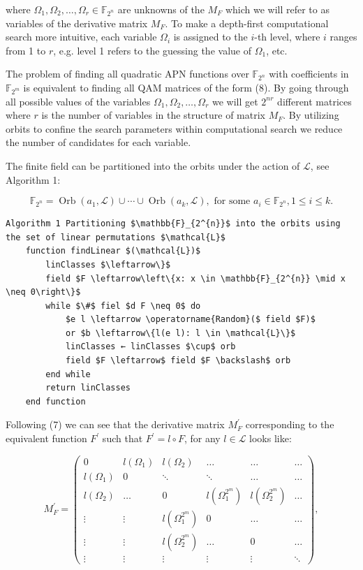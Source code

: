 \documentclass[10pt]{article}
\begin{document}
where $\Omega_{1}, \Omega_{2}, \ldots, \Omega_{r} \in \mathbb{F}_{2^{n}}$ are unknowns of the $M_{F}$ which we will refer to as variables of the derivative matrix $M_{F}$. To make a depth-first computational search more intuitive, each variable $\Omega_{i}$ is assigned to the $i$-th level, where $i$ ranges from 1 to $r$, e.g. level 1 refers to the guessing the value of $\Omega_{1}$, etc.

The problem of finding all quadratic APN functions over $\mathbb{F}_{2^{n}}$ with coefficients in $\mathbb{F}_{2^{m}}$ is equivalent to finding all QAM matrices of the form (8). By going through all possible values of the variables $\Omega_{1}, \Omega_{2}, \ldots, \Omega_{r}$ we will get $2^{n r}$ different matrices where $r$ is the number of variables in the structure of matrix $M_{F}$. By utilizing orbits to confine the search parameters within computational search we reduce the number of candidates for each variable.

The finite field can be partitioned into the orbits under the action of $\mathcal{L}$, see Algorithm 1:

$$
\mathbb{F}_{2^{n}}=\operatorname{Orb}\left(a_{1}, \mathcal{L}\right) \cup \cdots \cup \operatorname{Orb}\left(a_{k}, \mathcal{L}\right), \text { for some } a_{i} \in \mathbb{F}_{2^{n}}, 1 \leq i \leq k .
$$

\begin{verbatim}
Algorithm 1 Partitioning $\mathbb{F}_{2^{n}}$ into the orbits using the set of linear permutations $\mathcal{L}$
    function findLinear $(\mathcal{L})$
        linClasses $\leftarrow\}$
        field $F \leftarrow\left\{x: x \in \mathbb{F}_{2^{n}} \mid x \neq 0\right\}$
        while $\#$ fiel $d F \neq 0$ do
            $e l \leftarrow \operatorname{Random}($ field $F)$
            or $b \leftarrow\{l(e l): l \in \mathcal{L}\}$
            linClasses ← linClasses $\cup$ orb
            field $F \leftarrow$ field $F \backslash$ orb
        end while
        return linClasses
    end function
\end{verbatim}

Following (7) we can see that the derivative matrix $M_{F}^{\prime}$ corresponding to the equivalent function $F^{\prime}$ such that $F^{\prime}=l \circ F$, for any $l \in \mathcal{L}$ looks like:

$$
M_{F}^{\prime}=\left(\begin{array}{cccccc}
0 & l\left(\Omega_{1}\right) & l\left(\Omega_{2}\right) & \ldots & \ldots & \ldots \\
l\left(\Omega_{1}\right) & 0 & \ddots & \ddots & \ldots & \ldots \\
l\left(\Omega_{2}\right) & \ldots & 0 & l\left(\Omega_{1}^{2^{m}}\right) & l\left(\Omega_{2}^{2^{m}}\right) & \ldots \\
\vdots & \vdots & l\left(\Omega_{1}^{2^{m}}\right) & 0 & \ldots & \ldots \\
\vdots & \vdots & l\left(\Omega_{2}^{2^{m}}\right) & \ldots & 0 & \ldots \\
\vdots & \vdots & \vdots & \vdots & \vdots & \ddots
\end{array}\right),
$$
\end{document}
